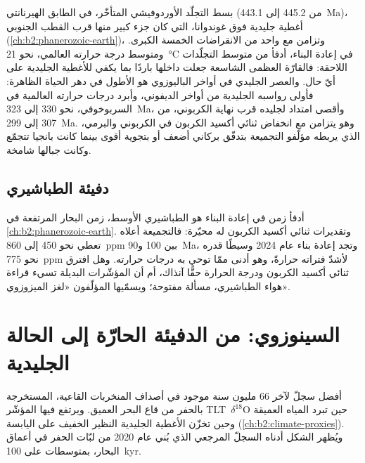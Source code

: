 بسط التجلّد الأوردوفيشي المتأخّر، في الطابق الهيرنانتي (من 445.2 إلى \qty{443.1}{Ma})، أغطية جليدية
فوق غوندوانا، التي كان جزء كبير منها قرب القطب الجنوبي (\cref{ch:b2:phanerozoic-earth})،
وتزامن مع واحد من الانقراضات الخمسة الكبرى. ومتوسط درجة حرارته العالمي، نحو
\qty{21}{\celsius} في إعادة البناء، أدفأ من متوسط التجلّدات اللاحقة: فالقارّة العظمى
الشاسعة جعلت داخلها باردًا بما يكفي للأغطية الجليدية على أيّ حال. والعصر الجليدي في أواخر الباليوزوي هو
الأطول في دهر الحياة الظاهرة: فأولى رواسبه الجليدية من أواخر الديفوني، وأبرد درجات حرارته
العالمية في السربوخوفي، نحو 330 إلى \qty{323}{Ma}، وأقصى امتداد
لجليده قرب نهاية الكربوني، من 307 إلى \qty{299}{Ma}. وهو يتزامن مع انخفاض ثنائي أكسيد
الكربون في الكربوني والبرمي، الذي يربطه مؤلّفو التجميعة بتدفّق بركاني أضعف
أو بتجوية أقوى بينما كانت بانجيا تتجمّع وكانت جبالها شامخة.

\subsection*{دفيئة الطباشيري}

أدفأ زمن في إعادة البناء هو الطباشيري الأوسط، زمن البحار المرتفعة
 في \cref{ch:b2:phanerozoic-earth}. وتقديرات ثنائي أكسيد الكربون له
محيّرة: فالتجميعة أعلاه تعطي نحو 450 إلى \qty{860}{ppm} بين 100
و\qty{90}{Ma}، وتجد إعادة بناء عام 2024 وسيطًا قدره نحو \qty{775}{ppm} لأشدّ
فتراته حرارةً، وهو أدنى ممّا توحي به درجات حرارته. وهل افترق ثنائي أكسيد الكربون ودرجة الحرارة حقًّا
آنذاك، أم أن المؤشّرات البديلة تسيء قراءة هواء الطباشيري، مسألة مفتوحة؛ ويسمّيها المؤلّفون «لغز
الميزوزوي».

\section{السينوزوي: من الدفيئة الحارّة إلى الحالة الجليدية}\label{sec:b2:deep-time-climate:cenozoic}

أفضل سجلّ لآخر 66 مليون سنة موجود في أصداف المنخربات القاعية، المستخرجة بالحفر من
قاع البحر العميق. ويرتفع فيها المؤشّر \mbox{\textdir TLT $\delta^{18}$O} حين تبرد المياه العميقة وحين تخزّن الأغطية الجليدية
النظير الخفيف على اليابسة (\cref{ch:b2:climate-proxies}). ويُظهر الشكل أدناه السجلّ
المرجعي الذي بُني عام 2020 من لبّات الحفر في أعماق البحار، بمتوسطات على \qty{100}{kyr}.

